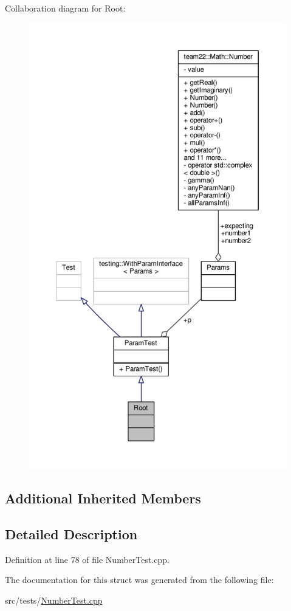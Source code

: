 Collaboration diagram for Root\+:
\nopagebreak
\begin{figure}[H]
\begin{center}
\leavevmode
\includegraphics[height=550pt]{struct_root__coll__graph}
\end{center}
\end{figure}
\subsection*{Additional Inherited Members}


\subsection{Detailed Description}


Definition at line 78 of file Number\+Test.\+cpp.



The documentation for this struct was generated from the following file\+:\begin{DoxyCompactItemize}
\item 
src/tests/\hyperlink{_number_test_8cpp}{Number\+Test.\+cpp}\end{DoxyCompactItemize}
